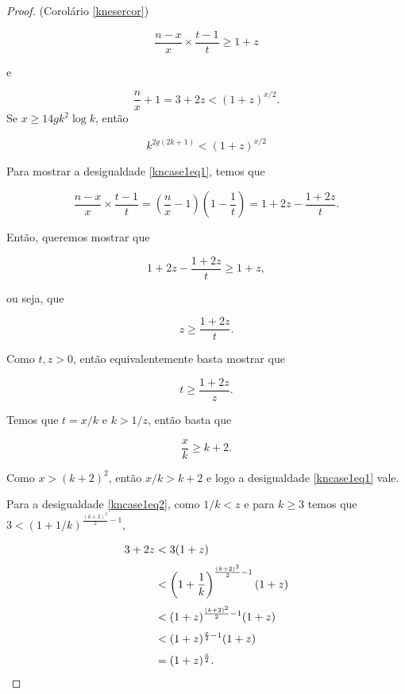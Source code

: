 \documentclass{article}
\begin{document}
\begin{proof}{(Corolário \ref{knesercor})}


\begin{equation}\label{kncase1eq1}
\frac{n-x}{x}\times \frac{t-1}{t} \geq 1+z
\end{equation}

e

\begin{equation}\label{kncase1eq2}
\frac{n}{x}+1 = 3+2z < (1+z)^{x/2}.
\end{equation}
Se $x \geq 14gk^2\log k$, então

\begin{equation}\label{kncase1eq3}
k^{2g(2k+1)} < (1+z)^{x/2}
\end{equation}

Para mostrar a desigualdade \ref{kncase1eq1}, temos que

\[\frac{n-x}{x}\times \frac{t-1}{t} = \left(\frac{n}{x} - 1\right)\left(1 - \frac{1}{t}\right) = 1 + 2z - \frac{1+2z}{t}.\]

Então, queremos mostrar que

\[1 + 2z - \frac{1+2z}{t} \geq 1 + z,\]

ou seja, que

\[z \geq \frac{1+2z}{t}.\]

Como $t,z > 0$, então equivalentemente basta mostrar que 

\[t \geq \frac{1+2z}{z}.\]

Temos que $t = x/k$ e $k > 1/z$, então basta que

\[\frac{x}{k} \geq k + 2.\]

Como $x>(k+2)^2$, então $x/k > k+2$ e logo a desigualdade \ref{kncase1eq1} vale.

Para a desigualdade \ref{kncase1eq2}, como $1/k < z$ e para $k\geq 3$ temos que $3 < (1+1/k)^{\frac{(k+2)^2}{2}-1}$,


\begin{equation*}
\setlength{\jot}{6pt}
\begin{aligned}
3 + 2z & < 3(1+z)\\
& < \left(1+\frac{1}{k}\right)^{\frac{(k+2)^2}{2}-1}(1+z)\\
& < (1+z)^{\frac{(k+2)^2}{2}-1}(1+z)\\
& < (1+z)^{\frac{x}{2}-1}(1+z) \\
& = (1+z)^{\frac{x}{2}}.
\end{aligned}
\end{equation*}


\end{proof}
\end{document}
